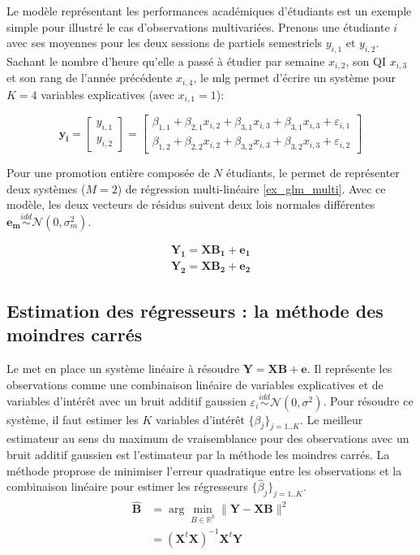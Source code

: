 Le modèle représentant les performances académiques d'étudiants est un exemple simple pour illustré le cas d'observations multivariées.
Prenons une étudiante $i$ avec ses moyennes pour les deux sessions de partiels semestriels $y_{i,1} \mbox{ et } y_{i,2}$.
Sachant le nombre d'heure qu'elle a passé à étudier par semaine $x_{i,2}$, son QI $x_{i,3}$ et son rang de l'année précédente $x_{i,4}$, 
le mlg permet d'écrire un système pour $K=4$ variables explicatives (avec $x_{i,1} = 1$):

\begin{equation}
    \mathbf{y_i} =
    \left[\begin{array}{c}y_{i,1}\\y_{i,2}\end{array}\right] = 
    \left[\begin{array}{c}\beta_{1,1} + \beta_{2,1}x_{i,2} + \beta_{3,1}x_{i,3} + \beta_{3,1}x_{i,3} + \varepsilon_{i,1}\\
			  \beta_{1,2} + \beta_{2,2}x_{i,2} + \beta_{3,2}x_{i,3} + \beta_{3,2}x_{i,3} + \varepsilon_{i,2}\end{array}\right] \nonumber
\end{equation}

Pour une promotion entière composée de $N$ étudiants, le \mlg permet de représenter deux systèmes ($M=2$) de régression multi-linéaire \eqref{ex_glm_multi}.
Avec ce modèle, les deux vecteurs de résidus suivent deux lois normales différentes $\mathbf{e_m} \overset{idd}{\sim} \mathcal{N}(0, \sigma^2_m)$.

\begin{align}
    \mathbf{Y_1} = \mathbf{X}\mathbf{B_1} + \mathbf{e_1} \nonumber \\
    \mathbf{Y_2} = \mathbf{X}\mathbf{B_2} + \mathbf{e_2} 
    \label{ex_glm_multi}
\end{align}


\subsection{Estimation des régresseurs : la méthode des moindres carrés}
Le \mlg met en place un système linéaire à résoudre $\mathbf{Y} = \mathbf{XB}+\mathbf{e}$. 
Il représente les observations comme une combinaison linéaire de variables explicatives 
et de variables d'intérêt avec un bruit additif gaussien $\varepsilon_{i} \overset{idd}{\sim} \mathcal{N}(0, \sigma^2) \label{res_iid}$.
Pour résoudre ce système, il faut estimer les $K$ variables d'intérêt  $\{\beta_{j}\}_{j=1..K}$.
Le meilleur estimateur au sens du maximum de vraisemblance pour des observations avec un bruit additif gaussien est l'estimateur par la méthode les moindres carrés.
La méthode proprose de minimiser l'erreur quadratique entre les observations et la combinaison linéaire pour estimer les régresseurs $\{\hat{\beta}_{j}\}_{j=1..K}$.
\begin{align}
    \mathbf{\hat{B}} &= \arg\min_{B \in \mathbb{R}^{k}}{\|\mathbf{Y} - \mathbf{X}\mathbf{B} \|^{2}} \nonumber\\
     &= (\mathbf{X}^{t}\mathbf{X})^{-1}\mathbf{X}^{t}\mathbf{Y}
    \label{ls_reg}
\end{align}

